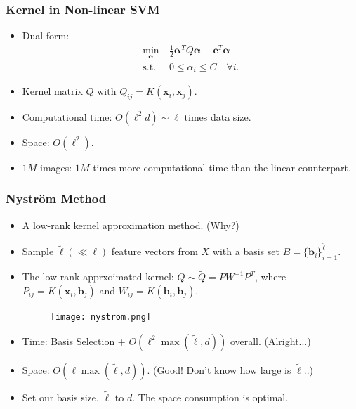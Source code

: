 \documentclass{beamer}
\def\bb{{\boldsymbol b}}
\def\balpha{{\boldsymbol \alpha}}
\def\bb{{\boldsymbol b}}
\def\be{{\boldsymbol e}}
\def\bx{{\boldsymbol x}}
\begin{document}
\begin{frame}
  \frametitle{Kernel in Non-linear SVM}
  \begin{itemize}
    \item Dual form:
    \begin{align}
    \label{eq:svmdual} \nonumber
    \min_{\balpha} \  &  \frac{1}{2} \balpha^T Q  \balpha - \be^T \balpha \nonumber \\
    \mbox{s.t.} \  & 0 \le \alpha_i \le C \quad \forall i \mbox{.} \nonumber
    \end{align}
    \item Kernel matrix $Q$ with $Q_{ij} = K(\bx_i, \bx_j)$.
    \pause
    \item [] Computational time: $O(\ell^2 d) \sim \ell$ times data size.
    \item [] Space: $O(\ell^2)$.
    \pause
    \item $1M$ images: $1M$ times more computational time than the linear counterpart.
  \end{itemize}
\end{frame}

\begin{frame}
  \frametitle{Nystr\"om Method}
  \begin{itemize}
    \item A low-rank kernel approximation method. (Why?)
    \pause
    \item Sample $\tilde{\ell} (\ll \ell)$ feature vectors from $X$ with a basis set $B = \{\bb_i\}_{i = 1}^{\tilde{\ell}}$.
    \item [] The low-rank apprxoimated kernel: $Q \sim \tilde{Q} = PW^{-1}P^T$, 
    where $P_{ij} = K(\bx_i, \bb_j)$ and $W_{ij} = K(\bb_i, \bb_j)$.
\begin{figure}
  \texttt{[image: nystrom.png]}\\
\end{figure}
    \pause
    \item Time: Basis Selection + $O(\ell^2 \max(\tilde{\ell}, d))$ overall. (Alright...)
    \item [] Space: $O(\ell \max(\tilde{\ell}, d))$. (Good! Don't know how large is $\tilde{\ell}$..)
    \pause
    \item Set our basis size, $\tilde{\ell}$ to $d$. The space consumption is optimal.
  \end{itemize}
\end{frame}
\end{document}
